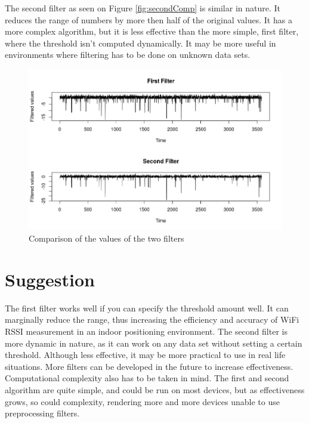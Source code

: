 The second filter as seen on Figure \ref{fig:secondComp} is similar in nature. It reduces the range of numbers by more then half of the original values. It has a more complex algorithm, but it is less effective than the more simple, first filter, where the threshold isn't computed dynamically. It may be more useful in environments where filtering has to be done on unknown data sets.	

\begin{figure}[h!]
	\centering
		\includegraphics[width=.9\linewidth]{figures/comp3.png}
		\caption{Comparison of the values of the two filters 
		}\label{fig:thirdComp}
\end{figure}


\section{Suggestion} 
The first filter works well if you can specify the threshold amount well. It can marginally reduce the range, thus increasing the efficiency and accuracy of WiFi RSSI measurement in an indoor positioning environment.  The second filter is more dynamic in nature, as it can work on any data set without setting a certain threshold. Although less effective, it may be more practical to use in real life situations. More filters can be developed in the future to increase effectiveness. Computational complexity also has to be taken in mind. The first and second algorithm are quite simple, and could be run on most devices, but as effectiveness grows, so could complexity, rendering more and more devices unable to use preprocessing filters.
